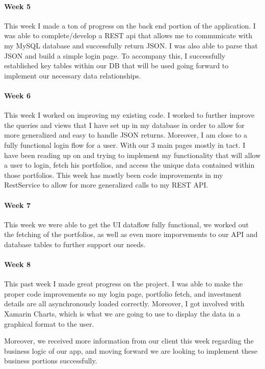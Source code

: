 \documentclass[onecolumn, draftclsnofoot,10pt, compsoc]{IEEEtran}
\begin{document}
\paragraph{Week 5}
This week I made a ton of progress on the back end portion of the application. I was able to complete/develop a REST api that allows me to communicate with my MySQL database and successfully return JSON. I was also able to parse that JSON and build a simple login page. To accompany this, I successfully established key tables within our DB that will be used going forward to implement our necessary data relationships.
\paragraph{Week 6}
This week I worked on improving my existing code. I worked to further improve the queries and views that I have set up in my database in order to allow for more generalized and easy to handle JSON returns. 
Moreover, I am close to a fully functional login flow for a user. With our 3 main pages mostly in tact. I have been reading up on and trying to implement my functionality that will allow a user to login, fetch his portfolios, and access the unique data contained within those portfolios. This week has mostly been code improvements in my RestService to allow for more generalized calls to my REST API.
\paragraph{Week 7}
This week we were able to get the UI dataflow fully functional, we worked out the fetching of the portfolios, as well as even more imporvements to our API and database tables to further support our needs. 
\paragraph{Week 8}
This past week I made great progress on the project. I was able to make the proper code improvements so my login page, portfolio fetch, and investment details are all asynchronously loaded correctly. Moreover, I got involved with Xamarin Charts, which is what we are going to use to display the data in a graphical format to the user. 
 
Moreover, we received more information from our client this week regarding the business logic of our app, and moving forward we are looking to implement these business portions successfully.
\end{document}
